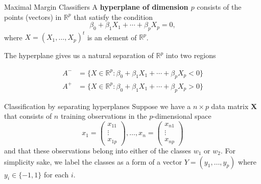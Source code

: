 \documentclass{beamer}
\begin{document}
\begin{frame}{Maximal Margin Classifiers}
	A {\bf hyperplane of dimension $p$} consists of the points (vectors) in $
\mathbb{R}^p$ that satisfy the condition
\begin{equation}
	\beta_0 + \beta_1 X_1 + \cdots + \beta_p X_p=0,
	\label{eq:hyper}
\end{equation}
where $X= (X_1,\ldots, X_p)^t $ is an element of $\mathbb{R}^p$. 

The hyperplane gives us a natural separation of $\mathbb{R}^p$ into two regions

\begin{equation*}
	\begin{split}
		A^-&= \{X \in \mathbb{R}^p : \beta_0 + \beta_1 X_1 + \cdots + \beta_p X_p<0 \} \\
		A^+&= \{X \in \mathbb{R}^p : \beta_0 + \beta_1 X_1 + \cdots + \beta_p X_p >0 \}
	\end{split}		
\end{equation*}

\end{frame}

\begin{frame}{Classification by separating hyperplanes}
	Suppose we have a $n\times p$ data matrix $\mathbf{X}$ that consists of $n$ training observations in the $p$-dimensional space
	\begin{equation*}
		x_1 = \begin{pmatrix}
			x_{11}\\ \vdots \\x_{1p} 
		\end{pmatrix}, \ldots, 
	x_n = \begin{pmatrix}
		x_{n1}\\ \vdots \\x_{np} 
	\end{pmatrix}
	\end{equation*}
and that these observations belong into either of the classes $w_1$ or $w_2$. For simplicity sake, we label the classes as a form of a  vector $Y=(y_1,\ldots,y_p)$ where $y_i \in \{-1,1\}$ for each $i$.


\end{frame}
\end{document}
